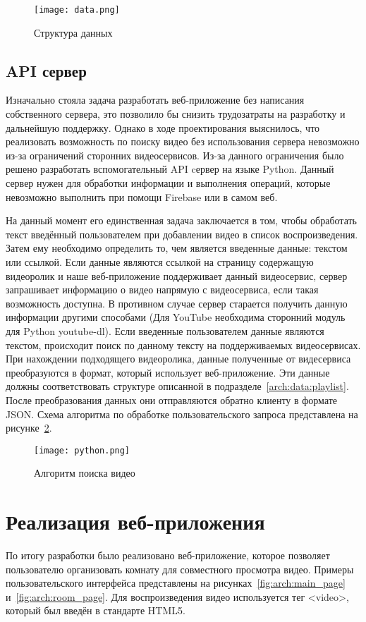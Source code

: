 \begin{figure}[H]
 \centering
   \texttt{[image: data.png]} 
   \caption{Структура данных}
   \label{fig:arch:docs_connections}
\end{figure}
 
\subsection{API сервер}
Изначально стояла задача разработать веб-приложение без написания собственного сервера, это позволило бы снизить трудозатраты на разработку и дальнейшую поддержку. Однако в ходе проектирования выяснилось, что реализовать возможность по поиску видео без использования сервера невозможно из-за ограничений сторонних видеосервисов. Из-за данного ограничения было решено разработать вспомогательный API cервер на языке Python. Данный сервер нужен для обработки информации и выполнения операций, которые невозможно выполнить при помощи Firebase или в самом веб.
 
На данный момент его единственная задача заключается в том, чтобы обработать текст введённый пользователем при добавлении видео в список воспроизведения.
Затем ему необходимо определить то, чем является введенные данные: текстом или ссылкой. 
Если данные являются ссылкой на страницу содержащую видеоролик и наше веб-приложение поддерживает данный видеосервис, сервер запрашивает информацию о видео напрямую с видеосервиса, если такая возможность доступна. 
В противном случае сервер старается получить данную информации другими способами (Для YouTube необходима сторонний модуль для Python youtube-dl). 
Если введенные пользователем данные являются текстом, происходит поиск по данному тексту на поддерживаемых видеосервисах.
При нахождении подходящего видеоролика, данные полученные от видесервиса преобразуются в формат, который использует веб-приложение.
Эти данные должны соответствовать структуре описанной в подразделе~\ref{arch:data:playlist}. 
После преобразования данных они отправляются обратно клиенту в формате JSON. 
Схема алгоритма по обработке пользовательского запроса представлена на рисунке~\ref{fig:arch:python_service}.
 
\begin{figure}[H]
 \centering
   \texttt{[image: python.png]} 
   \caption{Алгоритм поиска видео}
   \label{fig:arch:python_service}
\end{figure}
 
 
\section{Реализация веб-приложения}
\label{sec:code}
По итогу разработки было реализовано веб-приложение, которое позволяет пользователю организовать комнату для совместного просмотра видео. 
Примеры пользовательского интерфейса представлены на рисунках~\ref{fig:arch:main_page} и~\ref{fig:arch:room_page}.
Для воспроизведения видео используется тег <video>, который был введён в стандарте HTML5.

